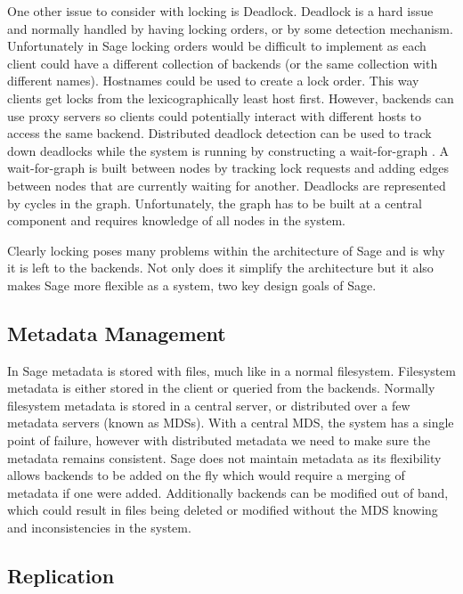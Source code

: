 One other issue to consider with locking is Deadlock. Deadlock is a hard issue and normally handled by having locking orders, or by some detection mechanism. Unfortunately in Sage locking orders would be difficult to implement as each client could have a different collection of backends (or the same collection with different names). Hostnames could be used to create a lock order. This way clients get locks from the lexicographically least host first. However, backends can use proxy servers so clients could potentially interact with different hosts to access the same backend. Distributed deadlock detection can be used to track down deadlocks while the system is running by constructing a wait-for-graph \cite{Haas1983}. A wait-for-graph is built between nodes by tracking lock requests and adding edges between nodes that are currently waiting for another. Deadlocks are represented by cycles in the graph. Unfortunately, the graph has to be built at a central component and requires knowledge of all nodes in the system.

Clearly locking poses many problems within the architecture of Sage and is why it is left to the backends. Not only does it simplify the architecture but it also makes Sage more flexible as a system, two key design goals of Sage.


\subsection{Metadata Management}

In Sage metadata is stored with files, much like in a normal filesystem. Filesystem metadata is either stored in the client or queried from the backends. Normally filesystem metadata is stored in a central server, or distributed over a few metadata servers (known as MDSs). With a central MDS, the system has a single point of failure, however with distributed metadata we need to make sure the metadata remains consistent. Sage does not maintain metadata as its flexibility allows backends to be added on the fly which would require a merging of metadata if one were added. Additionally backends can be modified out of band, which could result in files being deleted or modified without the MDS knowing and inconsistencies in the system.


\subsection{Replication}

